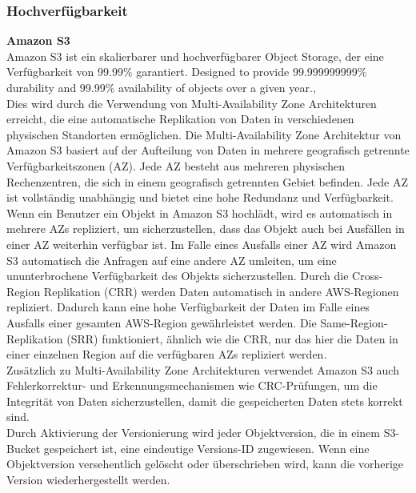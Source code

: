 \newpage

\subsubsection{Hochverfügbarkeit}

\textbf{Amazon S3}\\

Amazon S3 ist ein skalierbarer und hochverfügbarer Object Storage, der eine Verfügbarkeit von 99.99\% garantiert. \glqq Designed to provide 99.999999999\% durability and 99.99\% availability of objects over a given year.\grqq, \cite{aws-avail}\\

Dies wird durch die Verwendung von Multi-Availability Zone Architekturen erreicht, die eine automatische Replikation von Daten in verschiedenen physischen Standorten ermöglichen. Die Multi-Availability Zone Architektur von Amazon S3 basiert auf der Aufteilung von Daten in mehrere geografisch getrennte Verfügbarkeitszonen (AZ). Jede AZ besteht aus mehreren physischen Rechenzentren, die sich in einem geografisch getrennten Gebiet befinden. Jede AZ ist vollständig unabhängig und bietet eine hohe Redundanz und Verfügbarkeit. Wenn ein Benutzer ein Objekt in Amazon S3 hochlädt, wird es automatisch in mehrere AZs repliziert, um sicherzustellen, dass das Objekt auch bei Ausfällen in einer AZ weiterhin verfügbar ist. Im Falle eines Ausfalls einer AZ wird Amazon S3 automatisch die Anfragen auf eine andere AZ umleiten, um eine ununterbrochene Verfügbarkeit des Objekts sicherzustellen. Durch die Cross-Region Replikation (CRR) werden Daten automatisch in andere AWS-Regionen repliziert. Dadurch kann eine hohe Verfügbarkeit der Daten im Falle eines Ausfalls einer gesamten AWS-Region gewährleistet werden. Die Same-Region-Replikation (SRR) funktioniert, ähnlich wie die CRR, nur das hier die Daten in einer einzelnen Region auf die verfügbaren AZs repliziert werden.\\

Zusätzlich zu Multi-Availability Zone Architekturen verwendet Amazon S3 auch Fehlerkorrektur- und Erkennungsmechanismen wie CRC-Prüfungen, um die Integrität von Daten sicherzustellen, damit die gespeicherten Daten stets korrekt sind.\\

Durch Aktivierung der Versionierung wird jeder Objektversion, die in einem S3-Bucket gespeichert ist, eine eindeutige Versions-ID zugewiesen. Wenn eine Objektversion versehentlich gelöscht oder überschrieben wird, kann die vorherige Version wiederhergestellt werden.\\

